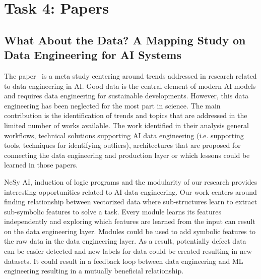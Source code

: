 \documentclass[11pt]{article}
\begin{document}
\newpage

\section*{Task 4: Papers}

\subsection*{What About the Data? A Mapping Study on Data Engineering for AI Systems}


The paper~\cite{heckWhatDataMapping2024} is a meta study centering around trends addressed in research related to data engineering in \ac{AI}. Good data is the central element of modern \ac{AI} models and requires data engineering for sustainable developments. However, this data engineering has been neglected for the most part in science. The main contribution is the identification of trends and topics that are addressed in the limited number of works available. The work identified in their analysis general workflows, technical solutions supporting \ac{AI} data engineering (i.e. supporting tools, techniques for identifying outliers), architectures that are proposed for connecting the data engineering and production layer or which lessons could be learned in those papers.

\ac{NeSy} AI, induction of logic programs and the modularity of our research provides interesting opportunities related to \ac{AI} data engineering. Our work centers around finding relationship between vectorized data where sub-structures learn to extract sub-symbolic features to solve a task. Every module learns its features independently and exploring which features are learned from the input can result on the data engineering layer. Modules could be used to add symbolic features to the raw data in the data engineering layer. As a result, potentially defect data can be easier detected and new labels for data could be created resulting in new datasets. It could result in a feedback loop between data engineering and \ac{ML} engineering resulting in a mutually beneficial relationship.
\end{document}

